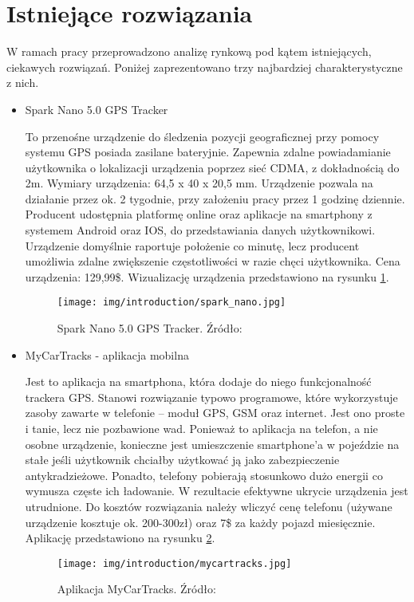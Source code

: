 \section{Istniejące rozwiązania}

W ramach pracy przeprowadzono analizę rynkową pod kątem istniejących, ciekawych rozwiązań. Poniżej zaprezentowano trzy najbardziej charakterystyczne z nich.

\begin{itemize}
\item Spark Nano 5.0 GPS Tracker

To przenośne urządzenie do śledzenia pozycji geograficznej przy pomocy systemu GPS posiada zasilane bateryjnie. Zapewnia zdalne powiadamianie użytkownika o lokalizacji urządzenia poprzez sieć CDMA, z dokładnością do 2m. Wymiary urządzenia: 64,5 x 40 x 20,5 mm. Urządzenie pozwala na działanie przez ok. 2 tygodnie, przy założeniu pracy przez 1 godzinę dziennie. Producent udostępnia platformę online oraz aplikacje na smartphony z systemem Android oraz IOS, do przedstawiania danych użytkownikowi.   Urządzenie domyślnie raportuje położenie co minutę, lecz producent umożliwia zdalne zwiększenie częstotliwości w razie chęci użytkownika. Cena urządzenia: 129,99\$. Wizualizację urządzenia przedstawiono na rysunku \ref{fig:image_spark_nano_tracker}.
\begin{figure}[h]
	\centering
	\texttt{[image: img/introduction/spark\_nano.jpg]}
	\caption{Spark Nano 5.0 GPS Tracker. Źródło: \cite{spark_nano}}
	\label{fig:image_spark_nano_tracker}
\end{figure}

\item MyCarTracks - aplikacja mobilna

Jest to aplikacja na smartphona, która dodaje do niego funkcjonalność trackera GPS. Stanowi rozwiązanie typowo programowe, które wykorzystuje zasoby zawarte w telefonie – moduł GPS, GSM oraz internet. Jest ono proste i tanie, lecz nie pozbawione wad. Ponieważ to aplikacja na telefon, a nie osobne urządzenie, konieczne jest umieszczenie smartphone’a w pojeździe na stałe jeśli użytkownik chciałby użytkować ją jako zabezpieczenie antykradzieżowe. Ponadto, telefony pobierają stosunkowo dużo energii co wymusza częste ich ładowanie. W rezultacie efektywne ukrycie urządzenia jest utrudnione. 
Do kosztów rozwiązania należy wliczyć cenę telefonu (używane urządzenie kosztuje ok. 200-300zł) oraz 7\$ za każdy pojazd miesięcznie. Aplikację przedstawiono na rysunku \ref{fig:image_my_car_tracks}.
\begin{figure}[h]
	\centering
	\texttt{[image: img/introduction/mycartracks.jpg]}
	\caption{Aplikacja MyCarTracks. Źródło: \cite{my_car_tracks}}
	\label{fig:image_my_car_tracks}
\end{figure}


\end{itemize}
